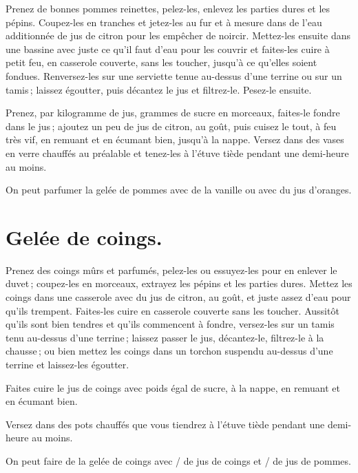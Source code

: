 Prenez de bonnes pommes reinettes, pelez-les, enlevez les parties dures et les
pépins. Coupez-les en tranches et jetez-les au fur et à mesure dans de l'eau
additionnée de jus de citron pour les empêcher de noircir. Mettez-les ensuite
dans une bassine avec juste ce qu'il faut d'eau pour les couvrir et faites-les
cuire à petit feu, en casserole couverte, sans les toucher, jusqu'à ce qu'elles
soient fondues. Renversez-les sur une serviette tenue au-dessus d’une terrine
ou sur un tamis ; laissez égoutter, puis décantez le jus et filtrez-le.
Pesez-le ensuite.

Prenez, par kilogramme de jus, {\mmm} grammes de sucre en morceaux,
faites-le fondre dans le jus ; ajoutez un peu de jus de citron, au goût, puis
cuisez le tout, à feu très vif, en remuant et en écumant bien, jusqu'à la
nappe. Versez dans des vases en verre chauffés au préalable et tenez-les
à l'étuve tiède pendant une demi-heure au moins.

\medskip

On peut parfumer la gelée de pommes avec de la vanille ou avec du jus d'oranges.

\section*{\centering Gelée de coings.}
{}

Prenez des coings mûrs et parfumés, pelez-les ou essuyez-les pour en enlever le
duvet ; coupez-les en morceaux, extrayez les pépins et les parties dures.
Mettez les coings dans une casserole avec du jus de citron, au goût, et juste
assez d'eau pour qu'ils trempent. Faites-les cuire en casserole couverte sans
les toucher. Aussitôt qu'ils sont bien tendres et qu'ils commencent à fondre,
versez-les sur un tamis tenu au-dessus d'une terrine ; laissez passer le jus,
décantez-le, filtrez-le à la chausse ; ou bien mettez les coings dans un
torchon suspendu au-dessus d'une terrine et laissez-les égoutter.

Faites cuire le jus de coings avec poids égal de sucre, à la nappe, en remuant et
en écumant bien.

Versez dans des pots chauffés que vous tiendrez à l'étuve tiède pendant une
demi-heure au moins.

\sk

On peut faire de la gelée de coings avec {\mmm}/{\mmm} de jus de
coings et {\mmm}/{\mmm} de jus de pommes.

